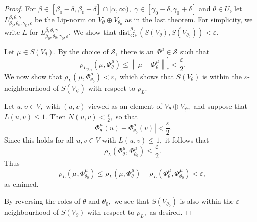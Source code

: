 \documentclass[a4paper,11pt,reqno]{amsart}
\theoremstyle{plain}
\theoremstyle{mainthmstyle}
\theoremstyle{named}
\numberwithin{equation}{section}
\begin{document}
\begin{proof}
For $\beta \in \left [\beta_0 - \delta, \beta_0 + \delta \right ] \cap [\alpha, \infty),$ $\gamma \in \left [\gamma_0 - \delta, \gamma_0 + \delta \right ]$ and $\theta\in U$, let $L^{\beta, \theta, \gamma}_{\beta_0, \theta_0, \gamma_0, \varepsilon}$ be the Lip-norm on $V_{\theta} \oplus V_{\theta_0}$ as in the last theorem. For simplicity, we write $L$ for $L^{\beta, \theta, \gamma}_{\beta_0, \theta_0, \gamma_0, \varepsilon}.$ We show that $\mathrm{dist}_{\mathrm{GH}}^{\rho_{L}} \left (S \left (V_{\theta} \right ), S \left (V_{\theta_0} \right ) \right ) < \varepsilon.$ 

Let $\mu \in S \left (V_{\theta} \right ).$ By the choice of $\mathcal S,$ there is an $\Phi^{\mu} \in \mathcal S$ such that 
$$\rho_{L_{\beta, \gamma}} \left (\mu, \Phi^{\mu}_{\theta} \right ) \leq \left \|\mu - \Phi_{\theta}^{\mu} \right \|_{\ast}^{\prime} < \frac {\varepsilon} {2}.$$
We now show that $\rho_{L} \left (\mu, \Phi^{\mu}_{\theta_0} \right ) < \varepsilon,$ which shows that $S \left (V_{\theta} \right )$ is within the $\varepsilon$-neighbourhood of $S \left (V_{\psi} \right )$ with respect to $\rho_L.$

Let $u, v \in V,$ with $(u, v)$ viewed as an element of $V_{\theta} \oplus V_{\psi},$ and suppose that $L (u, v) \leq 1.$ Then $N (u, v) < \frac {\varepsilon} {2},$ so that 
$$\left \lvert \Phi^{\mu}_{\theta} (u) - \Phi^{\mu}_{\theta_0} (v) \right \rvert < \frac {\varepsilon} {2}.$$ Since this holds for all $u, v \in V$ with $L (u, v) \leq 1,$ it follows that 
$$\rho_{L} \left (\Phi^{\mu}_{\theta}, \Phi^{\mu}_{\theta_0} \right ) \leq \frac {\varepsilon} {2}.$$ 
Thus 
$$\rho_L \left (\mu, \Phi^{\mu}_{\theta_0} \right ) \leq \rho_L \left (\mu, \Phi^{\mu}_{\theta} \right ) + \rho_L \left (\Phi^{\mu}_{\theta}, \Phi^{\mu}_{\theta_0} \right ) < \varepsilon,$$ as claimed.

By reversing the roles of $\theta$ and $\theta_0,$ we see that $S \left (V_{\theta_0} \right )$ is also within the $\varepsilon$-neighbourhood of $S \left (V_{\theta} \right )$ with respect to $\rho_L,$ as desired.

\end{proof}
\end{document}
